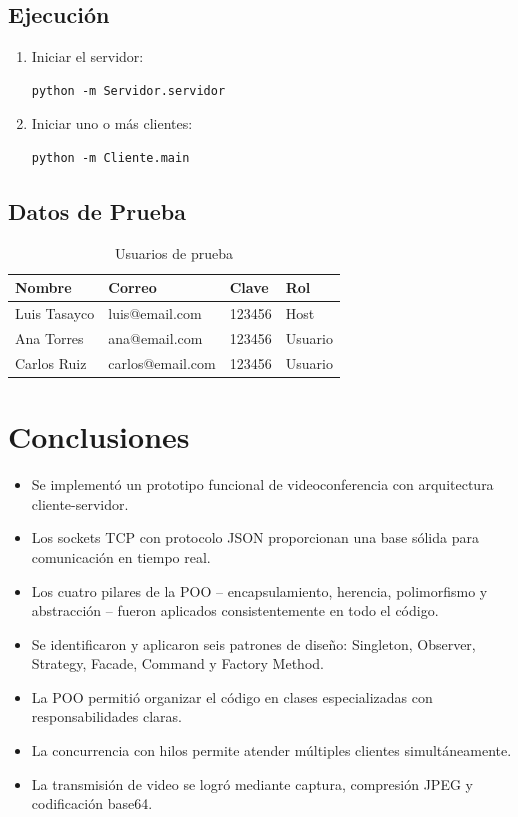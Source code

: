 \documentclass[12pt,a4paper]{article}
\begin{document}
\subsection{Ejecuci\'on}
\begin{enumerate}
    \item Iniciar el servidor:
    \begin{lstlisting}
python -m Servidor.servidor
    \end{lstlisting}
    \item Iniciar uno o m\'as clientes:
    \begin{lstlisting}
python -m Cliente.main
    \end{lstlisting}
\end{enumerate}

\subsection{Datos de Prueba}

\begin{table}[htbp]
    \centering
    \begin{tabular}{p{2.5cm}p{3cm}p{1.5cm}p{1.5cm}}
    \toprule
    \textbf{Nombre} & \textbf{Correo} & \textbf{Clave} & \textbf{Rol} \\
    \midrule
    Luis Tasayco  & luis@email.com   & 123456 & Host \\
    Ana Torres    & ana@email.com    & 123456 & Usuario \\
    Carlos Ruiz   & carlos@email.com & 123456 & Usuario \\
    \bottomrule
    \end{tabular}
    \caption{Usuarios de prueba}
\end{table}

\section{Conclusiones}

\begin{itemize}
    \item Se implement\'o un prototipo funcional de videoconferencia con arquitectura cliente-servidor.
    \item Los sockets TCP con protocolo JSON proporcionan una base s\'olida para comunicaci\'on en tiempo real.
    \item Los cuatro pilares de la POO -- encapsulamiento, herencia, polimorfismo y abstracci\'on -- fueron aplicados consistentemente en todo el c\'odigo.
    \item Se identificaron y aplicaron seis patrones de dise\~no: Singleton, Observer, Strategy, Facade, Command y Factory Method.
    \item La POO permiti\'o organizar el c\'odigo en clases especializadas con responsabilidades claras.
    \item La concurrencia con hilos permite atender m\'ultiples clientes simult\'aneamente.
    \item La transmisi\'on de video se logr\'o mediante captura, compresi\'on JPEG y codificaci\'on base64.
\end{itemize}
\end{document}
